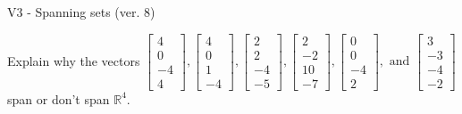 \begin{exercise}
  \begin{exerciseTitle}V3 - Spanning sets (ver. 8)\end{exerciseTitle}
  \begin{exerciseStatement}
    Explain why the vectors \(\left[\begin{array}{r}
4 \\
0 \\
-4 \\
4
\end{array}\right] , \left[\begin{array}{r}
4 \\
0 \\
1 \\
-4
\end{array}\right] , \left[\begin{array}{r}
2 \\
2 \\
-4 \\
-5
\end{array}\right] , \left[\begin{array}{r}
2 \\
-2 \\
10 \\
-7
\end{array}\right] , \left[\begin{array}{r}
0 \\
0 \\
-4 \\
2
\end{array}\right] , \text{ and } \left[\begin{array}{r}
3 \\
-3 \\
-4 \\
-2
\end{array}\right]\) span or don't span \(\mathbb{R}^4\). 
	



\end{exerciseStatement}
\end{exercise}
